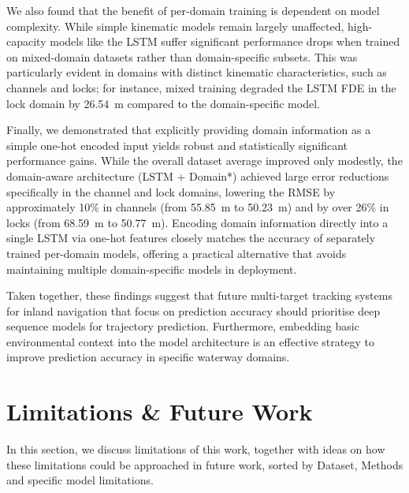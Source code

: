 We also found that the benefit of per-domain training is dependent on model complexity.
While simple kinematic models remain largely unaffected, high-capacity models like the \ac{LSTM} suffer significant performance drops when trained on mixed-domain datasets rather than domain-specific subsets.
This was particularly evident in domains with distinct kinematic characteristics, such as channels and locks; for instance, mixed training degraded the \ac{LSTM} \ac{FDE} in the lock domain by 26.54~m compared to the domain-specific model.

Finally, we demonstrated that explicitly providing domain information as a simple one-hot encoded input yields robust and statistically significant performance gains.
While the overall dataset average improved only modestly, the domain-aware architecture (\ac{LSTM} + Domain*) achieved large error reductions specifically in the channel and lock domains, lowering the \ac{RMSE} by approximately 10\% in channels (from 55.85~m to 50.23~m) and by over 26\% in locks (from 68.59~m to 50.77~m).
Encoding domain information directly into a single \ac{LSTM} via one-hot features closely matches the accuracy of separately trained per-domain models, offering a practical alternative that avoids maintaining multiple domain-specific models in deployment.


Taken together, these findings suggest that future multi-target tracking systems for inland navigation that focus on prediction accuracy should prioritise deep sequence models for trajectory prediction.
Furthermore, embedding basic environmental context into the model architecture is an effective strategy to improve prediction accuracy in specific waterway domains.


\section*{Limitations \& Future Work}%
\label{chap:limitation}

In this section, we discuss limitations of this work, together with ideas on how these limitations could be approached in future work, sorted by Dataset, Methods and specific model limitations. 


